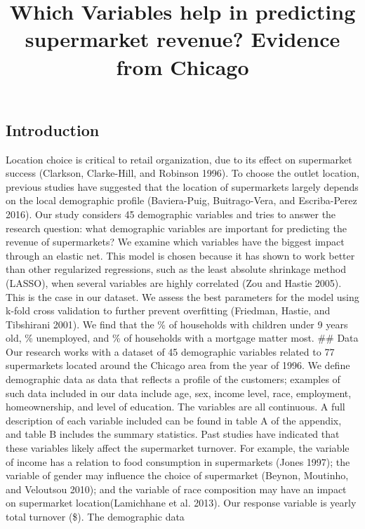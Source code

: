 \documentclass[
]{article}
\title{Which Variables help in predicting supermarket revenue? Evidence from
Chicago}
\author{}
\date{\vspace{-2.5em}}
\begin{document}
\maketitle

\hypertarget{introduction}{%
\subsection{Introduction}\label{introduction}}

Location choice is critical to retail organization, due to its effect on
supermarket success (Clarkson, Clarke-Hill, and Robinson 1996). To
choose the outlet location, previous studies have suggested that the
location of supermarkets largely depends on the local demographic
profile (Baviera-Puig, Buitrago-Vera, and Escriba-Perez 2016). Our study
considers 45 demographic variables and tries to answer the research
question: what demographic variables are important for predicting the
revenue of supermarkets? We examine which variables have the biggest
impact through an elastic net. This model is chosen because it has shown
to work better than other regularized regressions, such as the least
absolute shrinkage method (LASSO), when several variables are highly
correlated (Zou and Hastie 2005). This is the case in our dataset. We
assess the best parameters for the model using k-fold cross validation
to further prevent overfitting (Friedman, Hastie, and Tibshirani 2001).
We find that the \% of households with children under 9 years old, \%
unemployed, and \% of households with a mortgage matter most. \#\# Data
Our research works with a dataset of 45 demographic variables related to
77 supermarkets located around the Chicago area from the year of 1996.
We define demographic data as data that reflects a profile of the
customers; examples of such data included in our data include age, sex,
income level, race, employment, homeownership, and level of education.
The variables are all continuous. A full description of each variable
included can be found in table A of the appendix, and table B includes
the summary statistics. Past studies have indicated that these variables
likely affect the supermarket turnover. For example, the variable of
income has a relation to food consumption in supermarkets (Jones 1997);
the variable of gender may influence the choice of supermarket (Beynon,
Moutinho, and Veloutsou 2010); and the variable of race composition may
have an impact on supermarket location(Lamichhane et al. 2013). Our
response variable is yearly total turnover (\$). The demographic data
\end{document}

